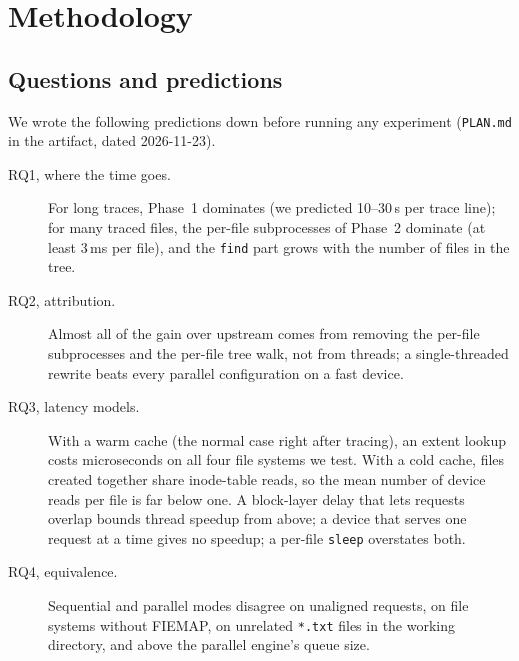 \section{Methodology}
\label{sec:method}

\subsection{Questions and predictions}
We wrote the following predictions down before running any experiment
(\texttt{PLAN.md} in the artifact, dated 2026-11-23).
\begin{description}
\item[RQ1, where the time goes.] For long traces, Phase~1 dominates (we predicted
  10--30\,\textmu s per trace line); for many traced files, the per-file
  subprocesses of Phase~2 dominate (at least 3\,ms per file), and the \texttt{find}
  part grows with the number of files in the tree.
\item[RQ2, attribution.] Almost all of the gain over upstream comes from removing
  the per-file subprocesses and the per-file tree walk, not from threads; a
  single-threaded rewrite beats every parallel configuration on a fast device.
\item[RQ3, latency models.] With a warm cache (the normal case right after
  tracing), an extent lookup costs microseconds on all four file systems we test.
  With a cold cache, files created together share inode-table reads, so the mean
  number of device reads per file is far below one. A block-layer delay that lets
  requests overlap bounds thread speedup from above; a device that serves one
  request at a time gives no speedup; a per-file \texttt{sleep} overstates both.
\item[RQ4, equivalence.] Sequential and parallel modes disagree on unaligned
  requests, on file systems without FIEMAP, on unrelated \texttt{*.txt} files in the
  working directory, and above the parallel engine's queue size.
\end{description}

